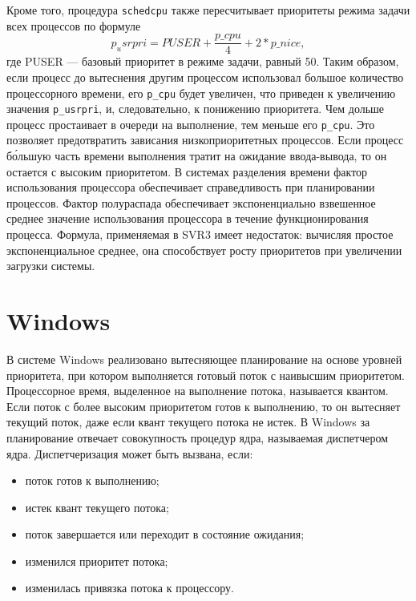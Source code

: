 \documentclass[a4paper,oneside,14pt]{extreport}
\newcommand{\code}[1]{\texttt{#1}}
\begin{document}
	Кроме того, процедура \code{schedcpu} также пересчитывает приоритеты режима задачи всех процессов по формуле
	\[
	{p_usrpri} = PUSER + \frac{p{\_}cpu}{4} + 2*{p{\_}nice},
	\]
	где PUSER --- базовый приоритет в режиме задачи, равный 50.
	Таким образом, если процесс до вытеснения другим процессом использовал большое количество процессорного времени, его \code{p{\_}cpu} будет увеличен, что приведен к увеличению значения \code{p{\_}usrpri}, и, следовательно, к понижению приоритета.
	Чем дольше процесс простаивает в очереди на выполнение, тем меньше его \code{p{\_}cpu}. Это позволяет предотвратить зависания низкоприоритетных процессов. Если процесс б\'{о}льшую часть времени выполнения тратит на ожидание ввода-вывода, то он остается с высоким приоритетом.
	В системах разделения времени фактор использования процессора обеспечивает справедливость при планировании процессов. Фактор полураспада обеспечивает экспоненциально взвешенное среднее значение использования процессора в течение функционирования процесса. Формула, применяемая в SVR3 имеет недостаток: вычисляя простое экспоненциальное среднее, она способствует росту приоритетов при увеличении загрузки системы.
	\section{Windows}
	В системе Windows реализовано вытесняющее планирование на основе уровней приоритета, при котором выполняется готовый поток с наивысшим приоритетом.
	Процессорное время, выделенное на выполнение потока, называется квантом. Если поток с более высоким приоритетом готов к выполнению, то он вытесняет текущий поток, даже если квант текущего потока не истек.
	В Windows за планирование отвечает совокупность процедур ядра, называемая диспетчером ядра. Диспетчеризация может быть вызвана, если:
	\begin{itemize}
		\item поток готов к выполнению;
		\item истек квант текущего потока;
		\item поток завершается или переходит в состояние ожидания;
		\item изменился приоритет потока;
		\item изменилась привязка потока к процессору.
	\end{itemize}
\end{document}
